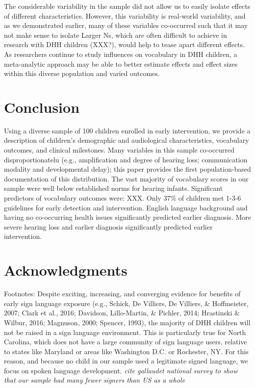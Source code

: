 \documentclass[english,man]{apa6}
\begin{document}
The considerable variability in the sample did not allow us to easily isolate effects of different characteristics. However, this variability is real-world variability, and as we demonstrated earlier, many of these variables co-occurred such that it may not make sense to isolate Larger Ns, which are often difficult to achieve in research with DHH children (XXX?), would help to tease apart different effects. As researchers continue to study influences on vocabulary in DHH children, a meta-analytic approach may be able to better estimate effects and effect sizes within this diverse population and varied outcomes.

\hypertarget{conclusion}{%
\section{Conclusion}\label{conclusion}}

Using a diverse sample of 100 children enrolled in early intervention, we provide a description of children's demographic and audiological characteristics, vocabulary outcomes, and clinical milestones. Many variables in this sample co-occurred disproportionatelu (e.g., amplification and degree of hearing loss; communication modality and developmental delay); this paper provides the first population-based documentation of this distribution. The vast majority of vocabulary scores in our sample were well below established norms for hearing infants. Significant predictors of vocabulary outcomes were: XXX. Only 37\% of children met 1-3-6 guidelines for early detection and intervention. English language background and having no co-occurring health issues significantly predicted earlier diagnosis. More severe hearing loss and earlier diagnosis significantly predicted earlier intervention.

\hypertarget{acknowledgments}{%
\section{Acknowledgments}\label{acknowledgments}}

Footnotes: Despite exciting, increasing, and converging evidence for benefits of early sign language exposure (e.g., Schick, De Villiers, De Villiers, \& Hoffmeister, 2007; Clark et al., 2016; Davidson, Lillo-Martin, \& Pichler, 2014; Hrastinski \& Wilbur, 2016; Magnuson, 2000; Spencer, 1993), the majority of DHH children will not be raised in a sign language environment. This is particularly true for North Carolina, which does not have a large community of sign language users, relative to states like Maryland or areas like Washington D.C. or Rochester, NY. For this reason, and because no child in our sample used a legitimate signed language, we focus on spoken language development. \emph{cite gallaudet national survey to show that our sample had many fewer signers than US as a whole}
\end{document}
